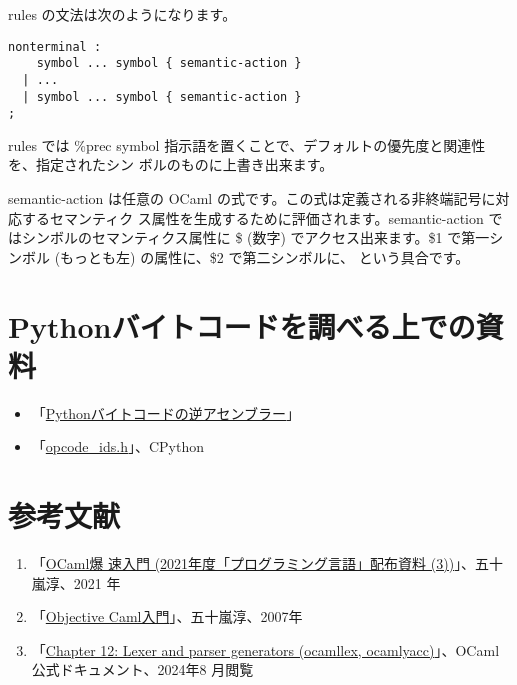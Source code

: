 \documentclass[a4paper,11pt]{jsarticle}
\begin{document}
rules の文法は次のようになります。

\begin{lstlisting}
nonterminal :
    symbol ... symbol { semantic-action }
  | ...
  | symbol ... symbol { semantic-action }
;
\end{lstlisting}

rules では \%prec symbol 指示語を置くことで、デフォルトの優先度と関連性を、指定されたシン
ボルのものに上書き出来ます。

semantic-action は任意の OCaml の式です。この式は定義される非終端記号に対応するセマンティク
ス属性を生成するために評価されます。semantic-action ではシンボルのセマンティクス属性に \$
(数字) でアクセス出来ます。\$1 で第一シンボル (もっとも左) の属性に、\$2 で第二シンボルに、
という具合です。

\newpage
\section{Pythonバイトコードを調べる上での資料}

\begin{itemize}
\item 「\href{https://docs.python.org/ja/3/library/dis.html}{Pythonバイトコードの逆アセンブラー}」
\item 「\href{https://github.com/python/cpython/blob/main/Include/opcode_ids.h}{opcode\_ids.h}」、CPython
\end{itemize}



\section{参考文献}

\begin{enumerate}
\item 「\href{https://www.fos.kuis.kyoto-u.ac.jp/~igarashi/class/pl/03-ocaml.pdf}{OCaml爆
    速入門 (2021年度「プログラミング言語」配布資料 (3))}」、五十嵐淳、2021
  年
\item
  「\href{https://www.fos.kuis.kyoto-u.ac.jp/~igarashi/class/isle4-11w/mltext.pdf}{Objective Caml入門}」、五十嵐淳、2007年
\item 「\href{https://ocaml.jp/archive/ocaml-manual-3.06-ja/manual026.html}{Chapter 12:
    Lexer and parser generators (ocamllex, ocamlyacc)}」、OCaml 公式ドキュメント、2024年8
  月閲覧
\end{enumerate}
\end{document}
